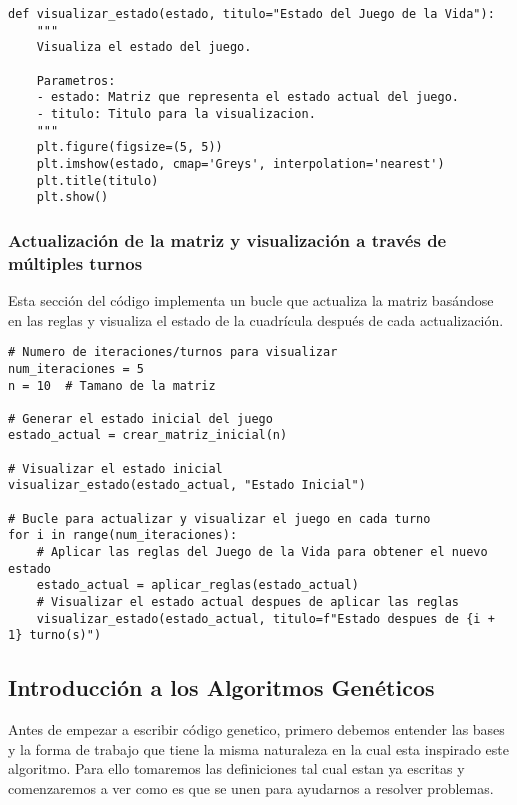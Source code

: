 \begin{lstlisting}
def visualizar_estado(estado, titulo="Estado del Juego de la Vida"):
    """
    Visualiza el estado del juego.
    
    Parametros:
    - estado: Matriz que representa el estado actual del juego.
    - titulo: Titulo para la visualizacion.
    """
    plt.figure(figsize=(5, 5))
    plt.imshow(estado, cmap='Greys', interpolation='nearest')
    plt.title(titulo)
    plt.show()
\end{lstlisting}

\subsubsection*{Actualización de la matriz y visualización a través de múltiples turnos}

Esta sección del código implementa un bucle que actualiza la matriz basándose en las reglas y 
visualiza el estado de la cuadrícula después de cada actualización.

\begin{lstlisting}
# Numero de iteraciones/turnos para visualizar
num_iteraciones = 5
n = 10  # Tamano de la matriz

# Generar el estado inicial del juego
estado_actual = crear_matriz_inicial(n)

# Visualizar el estado inicial
visualizar_estado(estado_actual, "Estado Inicial")

# Bucle para actualizar y visualizar el juego en cada turno
for i in range(num_iteraciones):
    # Aplicar las reglas del Juego de la Vida para obtener el nuevo estado
    estado_actual = aplicar_reglas(estado_actual)
    # Visualizar el estado actual despues de aplicar las reglas
    visualizar_estado(estado_actual, titulo=f"Estado despues de {i + 1} turno(s)")
\end{lstlisting}


\subsection{Introducción a los Algoritmos Genéticos}

Antes de empezar a escribir código genetico, primero debemos entender las bases y la forma 
de trabajo que tiene la misma naturaleza en la cual esta inspirado este algoritmo. Para 
ello tomaremos las definiciones tal cual estan ya escritas y comenzaremos a ver como es 
que se unen para ayudarnos a resolver problemas. \\ 

